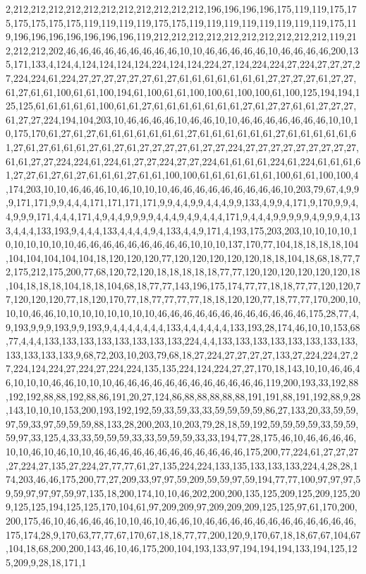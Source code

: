 2,212,212,212,212,212,212,212,212,212,212,212,196,196,196,196,175,119,119,175,175,175,175,175,175,119,119,119,119,175,175,119,119,119,119,119,119,119,119,175,119,196,196,196,196,196,196,196,119,212,212,212,212,212,212,212,212,212,212,119,212,212,212,202,46,46,46,46,46,46,46,46,46,10,10,46,46,46,46,46,10,46,46,46,46,200,135,171,133,4,124,4,124,124,124,124,224,124,124,224,27,124,224,224,27,224,27,27,27,27,224,224,61,224,27,27,27,27,27,27,61,27,61,61,61,61,61,61,61,27,27,27,27,61,27,27,61,27,61,61,100,61,61,100,194,61,100,61,61,100,100,61,100,100,61,100,125,194,194,125,125,61,61,61,61,61,100,61,61,27,61,61,61,61,61,61,61,27,61,27,27,61,61,27,27,27,61,27,27,224,194,104,203,10,46,46,46,46,10,46,46,10,10,46,46,46,46,46,46,46,10,10,10,175,170,61,27,61,27,61,61,61,61,61,61,61,27,61,61,61,61,61,61,27,61,61,61,61,61,61,27,61,27,61,61,61,27,61,27,61,27,27,27,27,61,27,27,224,27,27,27,27,27,27,27,27,27,61,61,27,27,224,224,61,224,61,27,27,224,27,27,224,61,61,61,61,224,61,224,61,61,61,61,27,27,61,27,61,27,61,61,61,27,61,61,100,100,61,61,61,61,61,61,100,61,61,100,100,4,174,203,10,10,46,46,46,10,46,10,10,10,46,46,46,46,46,46,46,46,46,10,203,79,67,4,9,9,9,171,171,9,9,4,4,4,171,171,171,171,9,9,4,4,9,9,4,4,4,9,9,133,4,9,9,4,171,9,170,9,9,4,4,9,9,9,171,4,4,4,171,4,9,4,4,9,9,9,9,4,4,4,9,4,9,4,4,4,171,9,4,4,4,9,9,9,9,9,4,9,9,9,4,133,4,4,4,133,193,9,4,4,4,133,4,4,4,4,9,4,133,4,4,9,171,4,193,175,203,203,10,10,10,10,10,10,10,10,10,10,46,46,46,46,46,46,46,46,46,10,10,10,137,170,77,104,18,18,18,18,104,104,104,104,104,104,18,120,120,120,77,120,120,120,120,120,18,18,104,18,68,18,77,72,175,212,175,200,77,68,120,72,120,18,18,18,18,18,77,77,120,120,120,120,120,120,18,104,18,18,18,104,18,18,104,68,18,77,77,143,196,175,174,77,77,18,18,77,77,120,120,77,120,120,120,77,18,120,170,77,18,77,77,77,77,18,18,120,120,77,18,77,77,170,200,10,10,10,46,46,10,10,10,10,10,10,10,10,46,46,46,46,46,46,46,46,46,46,46,46,175,28,77,4,9,193,9,9,9,193,9,9,193,9,4,4,4,4,4,4,4,133,4,4,4,4,4,4,133,193,28,174,46,10,10,153,68,77,4,4,4,133,133,133,133,133,133,133,133,224,4,4,133,133,133,133,133,133,133,133,133,133,133,133,9,68,72,203,10,203,79,68,18,27,224,27,27,27,27,133,27,224,224,27,27,224,124,224,27,224,27,224,224,135,135,224,124,224,27,27,170,18,143,10,10,46,46,46,10,10,10,46,46,10,10,10,46,46,46,46,46,46,46,46,46,46,46,46,119,200,193,33,192,88,192,192,88,88,192,88,86,191,20,27,124,86,88,88,88,88,88,191,191,88,191,192,88,9,28,143,10,10,10,153,200,193,192,192,59,33,59,33,33,59,59,59,59,86,27,133,20,33,59,59,97,59,33,97,59,59,59,88,133,28,200,203,10,203,79,28,18,59,192,59,59,59,59,33,59,59,59,97,33,125,4,33,33,59,59,59,33,33,59,59,59,33,33,194,77,28,175,46,10,46,46,46,46,10,10,46,10,46,10,10,46,46,46,46,46,46,46,46,46,46,46,46,175,200,77,224,61,27,27,27,27,224,27,135,27,224,27,77,77,61,27,135,224,224,133,135,133,133,133,224,4,28,28,174,203,46,46,175,200,77,27,209,33,97,97,59,209,59,59,97,59,194,77,77,100,97,97,97,59,59,97,97,97,59,97,135,18,200,174,10,10,46,202,200,200,135,125,209,125,209,125,209,125,125,194,125,125,170,104,61,97,209,209,97,209,209,209,125,125,97,61,170,200,200,175,46,10,46,46,46,46,10,10,46,10,46,46,10,46,46,46,46,46,46,46,46,46,46,46,46,175,174,28,9,170,63,77,77,67,170,67,18,18,77,77,200,120,9,170,67,18,18,67,67,104,67,104,18,68,200,200,143,46,10,46,175,200,104,193,133,97,194,194,194,133,194,125,125,209,9,28,18,171,1